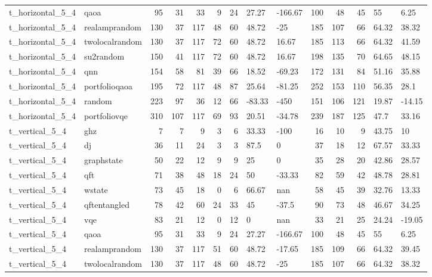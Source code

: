 \begin{longtable}{llrrrrrllrrrll}
t\_horizontal\_5\_4 & qaoa & 95 & 31 & 33 & 9 & 24 & 27.27 & -166.67 & 100 & 48 & 45 & 55 & 6.25 \\
t\_horizontal\_5\_4 & realamprandom & 130 & 37 & 117 & 48 & 60 & 48.72 & -25 & 185 & 107 & 66 & 64.32 & 38.32 \\
t\_horizontal\_5\_4 & twolocalrandom & 130 & 37 & 117 & 72 & 60 & 48.72 & 16.67 & 185 & 113 & 66 & 64.32 & 41.59 \\
t\_horizontal\_5\_4 & su2random & 150 & 41 & 117 & 72 & 60 & 48.72 & 16.67 & 198 & 135 & 70 & 64.65 & 48.15 \\
t\_horizontal\_5\_4 & qnn & 154 & 58 & 81 & 39 & 66 & 18.52 & -69.23 & 172 & 131 & 84 & 51.16 & 35.88 \\
t\_horizontal\_5\_4 & portfolioqaoa & 195 & 72 & 117 & 48 & 87 & 25.64 & -81.25 & 252 & 153 & 110 & 56.35 & 28.1 \\
t\_horizontal\_5\_4 & random & 223 & 97 & 36 & 12 & 66 & -83.33 & -450 & 151 & 106 & 121 & 19.87 & -14.15 \\
t\_horizontal\_5\_4 & portfoliovqe & 310 & 107 & 117 & 69 & 93 & 20.51 & -34.78 & 239 & 187 & 125 & 47.7 & 33.16 \\
t\_vertical\_5\_4 & ghz & 7 & 7 & 9 & 3 & 6 & 33.33 & -100 & 16 & 10 & 9 & 43.75 & 10 \\
t\_vertical\_5\_4 & dj & 36 & 11 & 24 & 3 & 3 & 87.5 & 0 & 37 & 18 & 12 & 67.57 & 33.33 \\
t\_vertical\_5\_4 & graphstate & 50 & 22 & 12 & 9 & 9 & 25 & 0 & 35 & 28 & 20 & 42.86 & 28.57 \\
t\_vertical\_5\_4 & qft & 71 & 38 & 48 & 18 & 24 & 50 & -33.33 & 82 & 59 & 42 & 48.78 & 28.81 \\
t\_vertical\_5\_4 & wstate & 73 & 45 & 18 & 0 & 6 & 66.67 & nan & 58 & 45 & 39 & 32.76 & 13.33 \\
t\_vertical\_5\_4 & qftentangled & 78 & 42 & 60 & 24 & 33 & 45 & -37.5 & 90 & 73 & 48 & 46.67 & 34.25 \\
t\_vertical\_5\_4 & vqe & 83 & 21 & 12 & 0 & 12 & 0 & nan & 33 & 21 & 25 & 24.24 & -19.05 \\
t\_vertical\_5\_4 & qaoa & 95 & 31 & 33 & 9 & 24 & 27.27 & -166.67 & 100 & 48 & 45 & 55 & 6.25 \\
t\_vertical\_5\_4 & realamprandom & 130 & 37 & 117 & 51 & 60 & 48.72 & -17.65 & 185 & 109 & 66 & 64.32 & 39.45 \\
t\_vertical\_5\_4 & twolocalrandom & 130 & 37 & 117 & 48 & 60 & 48.72 & -25 & 185 & 107 & 66 & 64.32 & 38.32 \\

\end{longtable}
